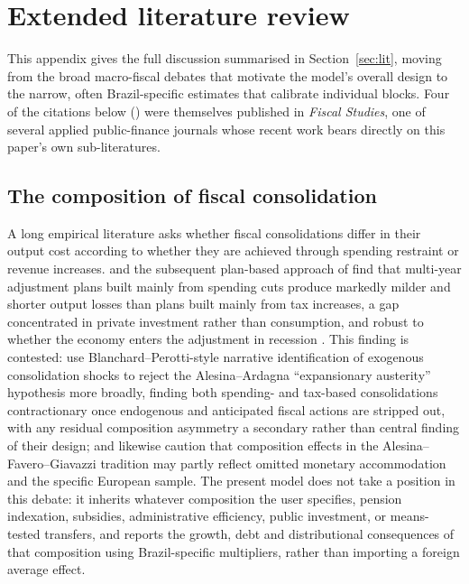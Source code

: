 \documentclass[11pt,a4paper]{article}
\begin{document}
\appendix
\section{Extended literature review}
\label{app:lit}

\noindent This appendix gives the full discussion summarised in Section~\ref{sec:lit}, moving from the broad macro-fiscal debates that motivate the model's overall design to the narrow, often Brazil-specific estimates that calibrate individual blocks. Four of the citations below (\citealp{levyyeyatisturzenegger2023,lagopenasetal2024,hanousekkocenda2011,balladaresgarciamiralles2026}) were themselves published in \textit{Fiscal Studies}, one of several applied public-finance journals whose recent work bears directly on this paper's own sub-literatures.

\subsection{The composition of fiscal consolidation}

A long empirical literature asks whether fiscal consolidations differ in their output cost according to whether they are achieved through spending restraint or revenue increases. \citet{alesinaardagna2010} and the subsequent plan-based approach of \citet{alesinafaverogiavazzi2015,alesinabarbierofaverogiavazzipardisi2015} find that multi-year adjustment plans built mainly from spending cuts produce markedly milder and shorter output losses than plans built mainly from tax increases, a gap concentrated in private investment rather than consumption, and robust to whether the economy enters the adjustment in recession \citep{alesinaazzalinietal2017}. This finding is contested: \citet{guajardoleighpescatori2014} use Blanchard--Perotti-style narrative identification of exogenous consolidation shocks to reject the Alesina--Ardagna ``expansionary austerity'' hypothesis more broadly, finding both spending- and tax-based consolidations contractionary once endogenous and anticipated fiscal actions are stripped out, with any residual composition asymmetry a secondary rather than central finding of their design; \citet{perotti2013} and \citet{jordaetal2013} likewise caution that composition effects in the Alesina--Favero--Giavazzi tradition may partly reflect omitted monetary accommodation and the specific European sample. The present model does not take a position in this debate: it inherits whatever composition the user specifies, pension indexation, subsidies, administrative efficiency, public investment, or means-tested transfers, and reports the growth, debt and distributional consequences of that composition using Brazil-specific multipliers, rather than importing a foreign average effect.
\end{document}

